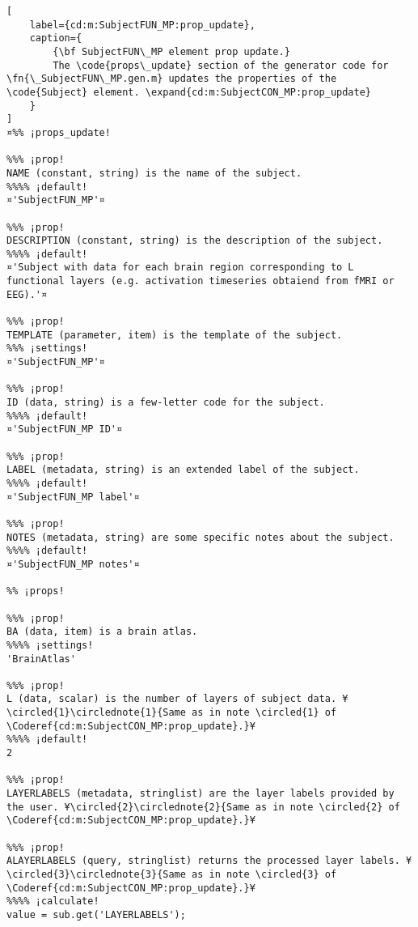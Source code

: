 \documentclass{tufte-handout}
\begin{document}
\begin{lstlisting}[
	label={cd:m:SubjectFUN_MP:prop_update},
	caption={
		{\bf SubjectFUN\_MP element prop update.}
		The \code{props\_update} section of the generator code for \fn{\_SubjectFUN\_MP.gen.m} updates the properties of the \code{Subject} element. \expand{cd:m:SubjectCON_MP:prop_update}
	}
]
¤%% ¡props_update!

%%% ¡prop!
NAME (constant, string) is the name of the subject.
%%%% ¡default!
¤'SubjectFUN_MP'¤

%%% ¡prop!
DESCRIPTION (constant, string) is the description of the subject.
%%%% ¡default!
¤'Subject with data for each brain region corresponding to L functional layers (e.g. activation timeseries obtaiend from fMRI or EEG).'¤

%%% ¡prop!
TEMPLATE (parameter, item) is the template of the subject.
%%% ¡settings!
¤'SubjectFUN_MP'¤

%%% ¡prop!
ID (data, string) is a few-letter code for the subject.
%%%% ¡default!
¤'SubjectFUN_MP ID'¤

%%% ¡prop!
LABEL (metadata, string) is an extended label of the subject.
%%%% ¡default!
¤'SubjectFUN_MP label'¤

%%% ¡prop!
NOTES (metadata, string) are some specific notes about the subject.
%%%% ¡default!
¤'SubjectFUN_MP notes'¤

%% ¡props!

%%% ¡prop!
BA (data, item) is a brain atlas.
%%%% ¡settings!
'BrainAtlas'

%%% ¡prop!
L (data, scalar) is the number of layers of subject data. ¥\circled{1}\circlednote{1}{Same as in note \circled{1} of \Coderef{cd:m:SubjectCON_MP:prop_update}.}¥
%%%% ¡default!
2

%%% ¡prop!
LAYERLABELS (metadata, stringlist) are the layer labels provided by the user. ¥\circled{2}\circlednote{2}{Same as in note \circled{2} of \Coderef{cd:m:SubjectCON_MP:prop_update}.}¥

%%% ¡prop!
ALAYERLABELS (query, stringlist) returns the processed layer labels. ¥\circled{3}\circlednote{3}{Same as in note \circled{3} of \Coderef{cd:m:SubjectCON_MP:prop_update}.}¥
%%%% ¡calculate!
value = sub.get('LAYERLABELS');


\end{lstlisting}
\end{document}
